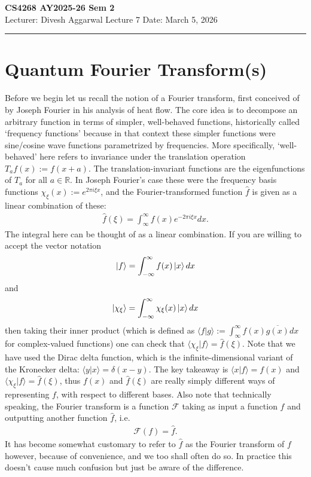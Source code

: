 \noindent
\textbf{CS4268 AY2025-26 Sem 2}
\\
\noindent
Lecturer: Divesh Aggarwal
\hfill
Lecture 7                      %
\hfill
Date: March 5, 2026          %


\noindent
\rule{\textwidth}{1pt}

\medskip

\section{Quantum Fourier Transform(s)}

Before we begin let us recall the notion of a Fourier transform, first conceived of by Joseph Fourier in his analysis of heat flow. The core idea is to decompose an arbitrary function in terms of simpler, well-behaved functions, historically called `frequency functions' because in that context these simpler functions were sine/cosine wave functions parametrized by frequencies. More specifically, `well-behaved' here refers to invariance under the translation operation $T_af(x):=f(x+a)$. The translation-invariant functions are the eigenfunctions of $T_a$ for all $a \in \mathbb{R}$. In Joseph Fourier's case these were 
the frequency basis functions $\chi_\xi(x):= e^{2\pi i \xi x}$, and the Fourier-transformed function $\hat{f}$ is given as a linear combination of these:
\begin{align*}
    \hat{f}(\xi) = \int_{\infty}^{\infty} f(x)e^{-2\pi i \xi x} dx.
\end{align*}
The integral here can be thought of as a linear combination. If you are willing to accept the vector notation
\begin{align*}
    \ket{f} = \int_{-\infty}^\infty f(x) \ket{x} dx
\end{align*}
and 
\begin{align*}
    \ket{\chi_\xi} = \int_{-\infty}^\infty \chi_\xi(x) \ket{x} dx
\end{align*}
then taking their inner product (which is defined as $\langle f|g \rangle:= \int_\infty^\infty f(x)\overline{g(x)} dx$ for complex-valued functions)
one can check that $\langle \chi_\xi|f \rangle = \hat{f}(\xi)$. Note that we have used the Dirac delta function, which is the infinite-dimensional variant of the Kronecker delta: $\langle y|x \rangle = \delta(x-y)$. The key takeaway is $\langle x|f \rangle = f(x)$ and $\langle \chi_\xi|f \rangle = \hat{f}(\xi)$, thus $f(x)$ and $\hat{f}(\xi)$ are really simply different ways of representing $f$, with respect to different bases. Also note that technically speaking, the Fourier transform is a function $\mathcal{F}$ taking as input a function $f$ and outputting another function $\hat{f}$, i.e.
\begin{align*}
    \mathcal{F}(f) = \hat{f}.
\end{align*}
It has become somewhat customary to refer to $\hat{f}$ as the Fourier transform of $f$ however, because of convenience, and we too shall often do so. In practice this doesn't cause much confusion but just be aware of the difference.

